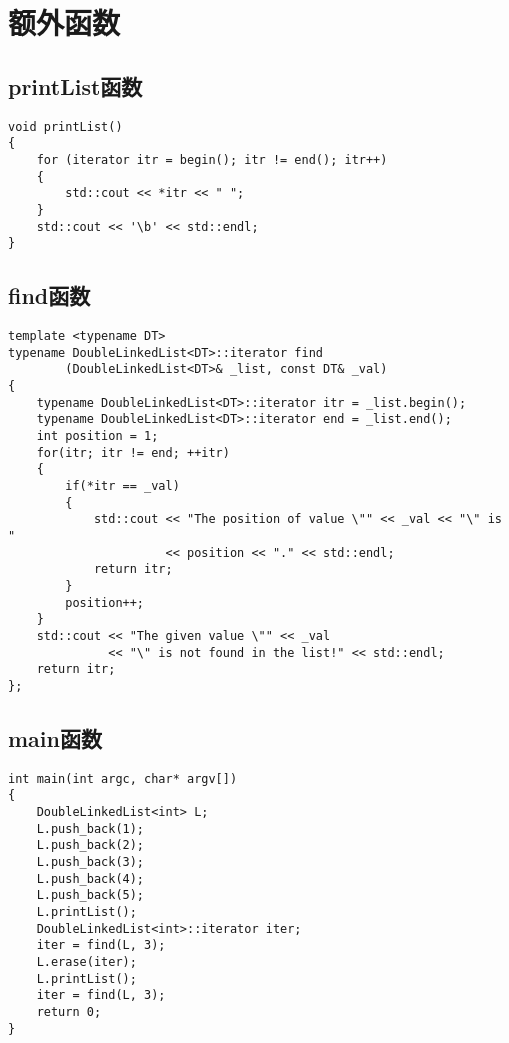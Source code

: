 \documentclass[UTF8]{ctexart}
\begin{document}
\newpage

\section{额外函数}

\subsection{printList函数}

\begin{lstlisting}
void printList() 
{
    for (iterator itr = begin(); itr != end(); itr++)
    {
        std::cout << *itr << " ";
    }
    std::cout << '\b' << std::endl;
}
\end{lstlisting}

\subsection{find函数}

\begin{lstlisting}
template <typename DT>
typename DoubleLinkedList<DT>::iterator find
        (DoubleLinkedList<DT>& _list, const DT& _val)
{
    typename DoubleLinkedList<DT>::iterator itr = _list.begin();
    typename DoubleLinkedList<DT>::iterator end = _list.end();
    int position = 1;
    for(itr; itr != end; ++itr)
    {
        if(*itr == _val)
        {
            std::cout << "The position of value \"" << _val << "\" is " 
                      << position << "." << std::endl;
            return itr;
        }
        position++;
    }
    std::cout << "The given value \"" << _val 
              << "\" is not found in the list!" << std::endl;
    return itr;
};
\end{lstlisting}

\newpage

\subsection{main函数}

\begin{lstlisting}
int main(int argc, char* argv[])
{
    DoubleLinkedList<int> L;
    L.push_back(1);
    L.push_back(2);
    L.push_back(3);
    L.push_back(4);
    L.push_back(5);
    L.printList();
    DoubleLinkedList<int>::iterator iter;
    iter = find(L, 3);
    L.erase(iter);
    L.printList();
    iter = find(L, 3);
    return 0;
}
\end{lstlisting}
\end{document}
